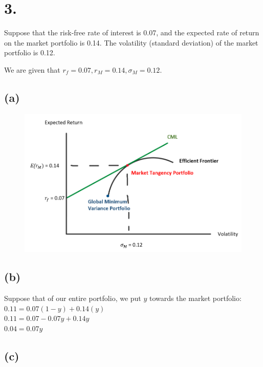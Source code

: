 \documentclass{article}
\begin{document}
{%

}

\section*{3.}
{\Large 

Suppose that the risk-free rate of interest is 0.07, and the expected rate of return on the market portfolio is 0.14. The volatility (standard deviation) of the market portfolio is 0.12.

We are given that $r_f = 0.07, r_M = 0.14, \sigma_M = 0.12$.

\subsection*{(a)}

\begin{figure}[h]
  \centering
  \includegraphics[width=120mm]{./3a.png}
\end{figure}

\subsection*{(b)}

Suppose that of our entire portfolio, we put $y$ towards the market portfolio:
$0.11 = 0.07(1-y) + 0.14(y)$ \\ 
$0.11 = 0.07 - 0.07y + 0.14y$ \\ 
$0.04 = 0.07y$ \\ 


\subsection*{(c)}

}
\end{document}
